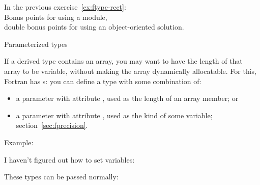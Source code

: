 \begin{exercise}
  In the previous exercise~\ref{ex:ftype-rect}:\\
  Bonus points for using a module,\\
  double bonus points for using an object-oriented solution.
\end{exercise}

 {Parameterized types}

If a derived type contains an array,
you may want to have the length of that array
to be variable, without making the array dynamically allocatable.
For this, Fortran has s:
you can define a type with some combination of:
\begin{itemize}
\item a parameter with attribute ,
  used as the length of an array member; or
\item a parameter with attribute ,
  used as the kind of some variable; section~\ref{sec:fprecision}.
\end{itemize}

Example:

I haven't figured out how to set variables:

These types can be passed normally:
